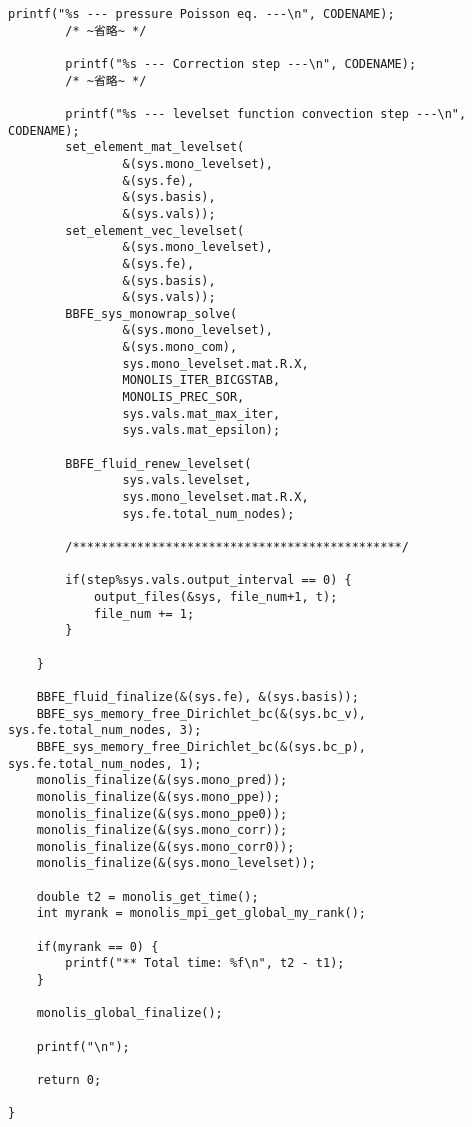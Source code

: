 \begin{lstlisting}[caption = mlflow\_fs.cのmain関数のレベルセット関数の計算部分抜粋]
		printf("%s --- pressure Poisson eq. ---\n", CODENAME);
		/* ~省略~ */

		printf("%s --- Correction step ---\n", CODENAME);
		/* ~省略~ */
		
		printf("%s --- levelset function convection step ---\n", CODENAME);
		set_element_mat_levelset(
				&(sys.mono_levelset),
				&(sys.fe),
				&(sys.basis),
				&(sys.vals));
		set_element_vec_levelset(
				&(sys.mono_levelset),
				&(sys.fe),
				&(sys.basis),
				&(sys.vals));
		BBFE_sys_monowrap_solve(
				&(sys.mono_levelset),
				&(sys.mono_com),
				sys.mono_levelset.mat.R.X,
				MONOLIS_ITER_BICGSTAB,
				MONOLIS_PREC_SOR,
				sys.vals.mat_max_iter,
				sys.vals.mat_epsilon);

		BBFE_fluid_renew_levelset(
				sys.vals.levelset, 
				sys.mono_levelset.mat.R.X,
				sys.fe.total_num_nodes);

		/**********************************************/

		if(step%sys.vals.output_interval == 0) {
			output_files(&sys, file_num+1, t);
			file_num += 1;
		}

	}

	BBFE_fluid_finalize(&(sys.fe), &(sys.basis));
	BBFE_sys_memory_free_Dirichlet_bc(&(sys.bc_v), sys.fe.total_num_nodes, 3);
	BBFE_sys_memory_free_Dirichlet_bc(&(sys.bc_p), sys.fe.total_num_nodes, 1);
	monolis_finalize(&(sys.mono_pred));
	monolis_finalize(&(sys.mono_ppe));
	monolis_finalize(&(sys.mono_ppe0));
	monolis_finalize(&(sys.mono_corr));
	monolis_finalize(&(sys.mono_corr0));
	monolis_finalize(&(sys.mono_levelset));

	double t2 = monolis_get_time();
	int myrank = monolis_mpi_get_global_my_rank();

	if(myrank == 0) {
		printf("** Total time: %f\n", t2 - t1);
	}

	monolis_global_finalize();

	printf("\n");

	return 0;

}
\end{lstlisting}

